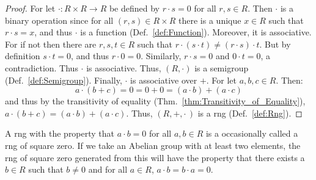         \begin{proof}
            For let $\cdot:R\times{R}\rightarrow{R}$ be defined by $r\cdot{s}=0$
            for all $r,s\in{R}$. Then $\cdot$ is a binary operation since for
            all $(r,s)\in{R}\times{R}$ there is a unique $x\in{R}$ such that
            $r\cdot{s}=x$, and thus $\cdot$ is a function
            (Def.~\ref{def:Function}). Moreover, it is associative. For if not
            then there are $r,s,t\in{R}$ such that
            $r\cdot(s\cdot{t})\ne(r\cdot{s})\cdot{t}$. But by definition
            $s\cdot{t}=0$, and thus $r\cdot{0}=0$. Similarly, $r\cdot{s}=0$
            and $0\cdot{t}=0$, a contradiction. Thus $\cdot$ is associative.
            Thus, $(R,\cdot)$ is a semigroup (Def.~\ref{def:Semigroup}).
            Finally, $\cdot$ is associative over $+$. For let $a,b,c\in{R}$.
            Then:
            \begin{equation}
                a\cdot(b+c)=0=0+0=(a\cdot{b})+(a\cdot{c})
            \end{equation}
            and thus by the transitivity of equality
            (Thm.~\ref{thm:Transitivity_of_Equality}),
            $a\cdot(b+c)=(a\cdot{b})+(a\cdot{c})$. Thus, $(R,+,\cdot\,)$ is a
            rng (Def.~\ref{def:Rng}).
        \end{proof}
        A rng with the property that $a\cdot{b}=0$ for all $a,b\in{R}$ is a
        occasionally called a rng of square zero. If we take an Abelian group
        with at least two elements, the rng of square zero generated from this
        will have the property that there exists a $b\in{R}$ such that $b\ne{0}$
        and for all $a\in{R}$, $a\cdot{b}=b\cdot{a}=0$.
